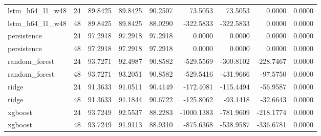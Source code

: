 \begin{table}[htbp]
\begin{tabular}{lrrrrrrrr}
lstm\_h64\_l1\_w48 & 24 & 89.8425 & 89.8425 & 90.2507 & 73.5053 & 73.5053 & 0.0000 & 0.0000 \\
lstm\_h64\_l1\_w48 & 48 & 89.8425 & 89.8425 & 88.0290 & -322.5833 & -322.5833 & 0.0000 & 0.0000 \\
persistence & 24 & 97.2918 & 97.2918 & 97.2918 & 0.0000 & 0.0000 & 0.0000 & 0.0000 \\
persistence & 48 & 97.2918 & 97.2918 & 97.2918 & 0.0000 & 0.0000 & 0.0000 & 0.0000 \\
random\_forest & 24 & 93.7271 & 92.4987 & 90.8582 & -529.5569 & -300.8102 & -228.7467 & 0.0000 \\
random\_forest & 48 & 93.7271 & 93.2051 & 90.8582 & -529.5416 & -431.9666 & -97.5750 & 0.0000 \\
ridge & 24 & 91.3633 & 91.0511 & 90.4149 & -172.4081 & -115.4494 & -56.9587 & 0.0000 \\
ridge & 48 & 91.3633 & 91.1844 & 90.6722 & -125.8062 & -93.1418 & -32.6643 & 0.0000 \\
xgboost & 24 & 93.7249 & 92.5537 & 88.2283 & -1000.1383 & -781.9609 & -218.1774 & 0.0000 \\
xgboost & 48 & 93.7249 & 91.9113 & 88.9310 & -875.6368 & -538.9587 & -336.6781 & 0.0000 \\
\bottomrule
\end{tabular}
\end{table}
